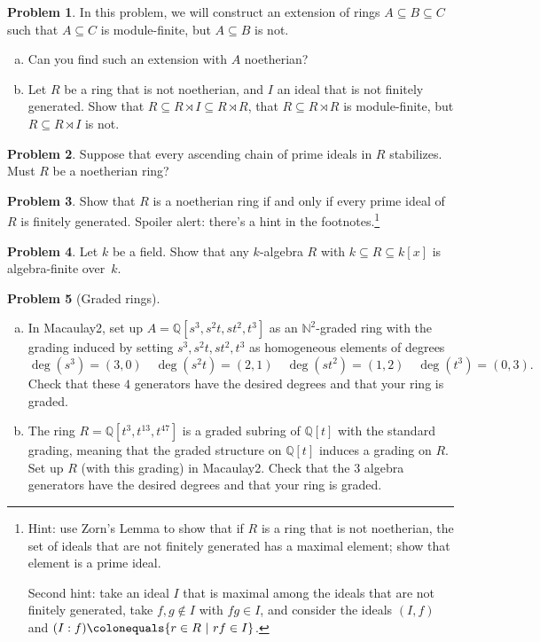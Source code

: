 \documentclass[11pt]{article}
\theoremstyle{definition}
\newtheorem{problem}{Problem}
\begin{document}
\begin{problem}
In this problem, we will construct an extension of rings $A \subseteq B \subseteq C$ such that $A \subseteq C$ is module-finite, but $A \subseteq B$ is not.

\begin{enumerate}[a)]
\item Can you find such an extension with $A$ noetherian?
\item Let $R$ be a ring that is not noetherian, and $I$ an ideal that is not finitely generated. 
Show that ${R \subseteq R \rtimes I \subseteq R \rtimes R}$, that $R \subseteq R \rtimes R$ is module-finite, but  $R \subseteq R \rtimes I$ is not.
\end{enumerate}
\end{problem}




\begin{problem}
	Suppose that every ascending chain of prime ideals in $R$ stabilizes. Must $R$ be a noetherian ring? 
\end{problem}



\begin{problem}
Show that $R$ is a noetherian ring if and only if every prime ideal of $R$ is finitely generated.
Spoiler alert: there's a hint in the footnotes.\footnote{Hint: use Zorn's Lemma to show that if $R$ is a ring that is not noetherian, the set of ideals that are not finitely generated has a maximal element; show that element is a prime ideal.

Second hint: take an ideal $I$ that is maximal among the ideals that are not finitely generated, take $f,g\notin I$ with $fg\in I$, and consider the ideals $(I,f)$ and $(I:f)  \colonequals \{ r\in R \ | \ rf\in I\}$.}
\end{problem}


\begin{problem}
	Let $k$ be a field. Show that any $k$-algebra $R$ with $k \subseteq R \subseteq k[x]$ is algebra-finite over~$k$.
\end{problem}


\begin{problem}[Graded rings]
$\,$
	\begin{enumerate}[a)]
		\item In Macaulay2, set up $A = \mathbb{Q}[s^3,s^2t,st^2,t^3]$ as an $\mathbb{N}^2$-graded ring with the grading induced by setting $s^3, s^2t, st^2, t^3$ as homogeneous elements of degrees
		$$\deg(s^3) = (3,0) \quad \deg(s^2t) = (2,1) \quad \deg(st^2) = (1,2) \quad \deg(t^3) = (0,3).$$
	Check that these $4$ generators have the desired degrees and that your ring is graded.
		\item The ring $R=\mathbb{Q}[t^3,t^{13},t^{47}]$ is a graded subring of $\mathbb{Q}[t]$ with the standard grading, meaning that the graded structure on $\mathbb{Q}[t]$ induces a grading on $R$. Set up $R$ (with this grading) in Macaulay2.
		Check that the $3$ algebra generators have the desired degrees and that your ring is graded.
	\end{enumerate}
\end{problem}
\end{document}
